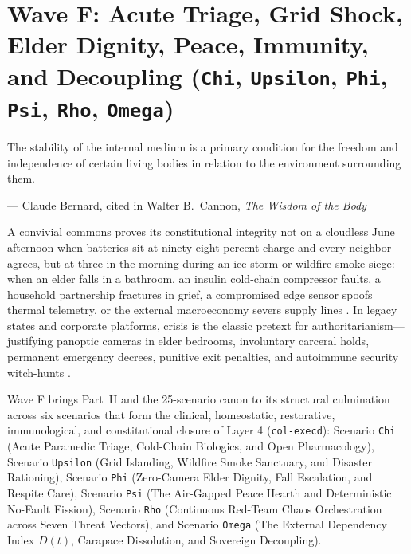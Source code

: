 \chapter{Wave F: Acute Triage, Grid Shock, Elder Dignity, Peace, Immunity, and Decoupling (\texttt{Chi}, \texttt{Upsilon}, \texttt{Phi}, \texttt{Psi}, \texttt{Rho}, \texttt{Omega})}
\label{ch:wave-f}

\epigraph{The stability of the internal medium is a primary condition for the freedom and independence of certain living bodies in relation to the environment surrounding them.}{--- Claude Bernard, cited in Walter B.~Cannon, \textit{The Wisdom of the Body} \parencite{cannon1932}}

A convivial commons proves its constitutional integrity not on a cloudless June afternoon when batteries sit at ninety-eight percent charge and every
neighbor agrees, but at three in the morning during an ice storm or wildfire smoke siege: when an elder falls in a bathroom, an insulin cold-chain
compressor faults, a household partnership fractures in grief, a compromised edge sensor spoofs thermal telemetry, or the external macroeconomy severs
supply lines \parencite{cannon1932,holling1973,beer1979}. In legacy states and corporate platforms, crisis is the classic pretext for
authoritarianism---justifying panoptic cameras in elder bedrooms, involuntary carceral holds, permanent emergency decrees, punitive exit penalties, and
autoimmune security witch-hunts \parencite{scott1998,zuboff2019}.

Wave F brings Part~II and the 25-scenario canon to its structural culmination across six scenarios that form the clinical, homeostatic, restorative,
immunological, and constitutional closure of Layer 4 (\texttt{col-execd}): Scenario \texttt{Chi} (Acute Paramedic Triage, Cold-Chain Biologics, and Open
Pharmacology), Scenario \texttt{Upsilon} (Grid Islanding, Wildfire Smoke Sanctuary, and Disaster Rationing), Scenario \texttt{Phi} (Zero-Camera Elder
Dignity, Fall Escalation, and Respite Care), Scenario \texttt{Psi} (The Air-Gapped Peace Hearth and Deterministic No-Fault Fission), Scenario
\texttt{Rho} (Continuous Red-Team Chaos Orchestration across Seven Threat Vectors), and Scenario \texttt{Omega} (The External Dependency Index $D(t)$,
Carapace Dissolution, and Sovereign Decoupling).

